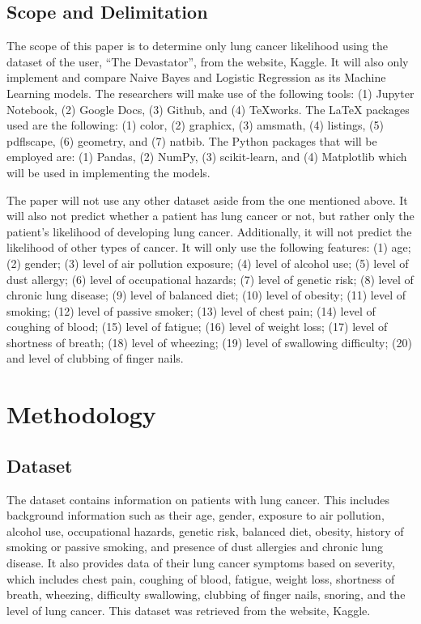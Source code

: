 \documentclass[runningheads]{llncs}
\begin{document}
\subsection{Scope and Delimitation}
The scope of this paper is to determine only lung cancer likelihood using the dataset of the user, “The Devastator”, from the website, Kaggle. It will also only implement and compare Naive Bayes and Logistic Regression as its Machine Learning models. The researchers will make use of the following tools: (1) Jupyter Notebook, (2) Google Docs, (3) Github, and (4) TeXworks. The LaTeX packages used are the following: (1) color, (2) graphicx, (3) amsmath, (4) listings, (5) pdflscape, (6) geometry, and (7) natbib. The Python packages that will be employed are: (1) Pandas, (2) NumPy, (3) scikit-learn, and (4) Matplotlib which will be used in implementing the models.

The paper will not use any other dataset aside from the one mentioned above. It will also not predict whether a patient has lung cancer or not, but rather only the patient’s likelihood of developing lung cancer. Additionally, it will not predict the likelihood of other types of cancer. It will only use the following features: (1) age; (2) gender; (3) level of air pollution exposure; (4) level of alcohol use; (5) level of dust allergy; (6) level of occupational hazards; (7) level of genetic risk; (8) level of chronic lung disease; (9) level of balanced diet; (10) level of obesity; (11) level of smoking; (12) level of passive smoker; (13) level of chest pain; (14) level of coughing of blood; (15) level of fatigue; (16) level of weight loss; (17) level of shortness of breath; (18) level of wheezing; (19) level of swallowing difficulty; (20) and level of clubbing of finger nails.

\section{Methodology}

\subsection{Dataset}
The dataset contains information on patients with lung cancer. This includes background information such as their age, gender, exposure to air pollution, alcohol use, occupational hazards, genetic risk, balanced diet, obesity, history of smoking or passive smoking, and presence of dust allergies and chronic lung disease. It also provides data of their lung cancer symptoms based on severity, which includes chest pain, coughing of blood, fatigue, weight loss, shortness of breath, wheezing, difficulty swallowing, clubbing of finger nails, snoring, and the level of lung cancer. This dataset was retrieved from the website, Kaggle.
\end{document}
